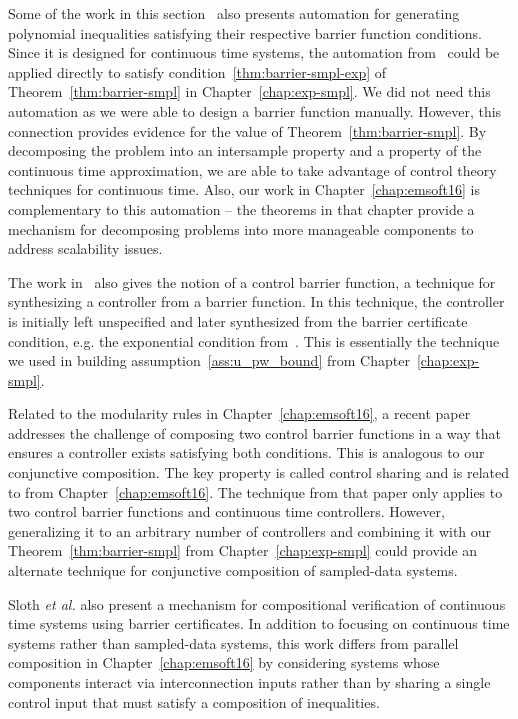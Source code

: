 Some of the work in this
section~\cite{Dai17revisited,kong2013barrier,Zeng16barrier} also presents
automation for generating polynomial inequalities satisfying their
respective barrier function conditions. Since it is designed for continuous
time systems, the automation from~\cite{kong2013barrier} could be applied
directly to satisfy condition~\eqref{thm:barrier-smpl-exp} of
Theorem~\ref{thm:barrier-smpl} in Chapter~\ref{chap:exp-smpl}. We did not
need this automation as we were able to design a barrier function
manually. However, this connection provides evidence for the value of
Theorem~\ref{thm:barrier-smpl}. By decomposing the problem into an
intersample property and a property of the continuous time approximation,
we are able to take advantage of control theory techniques for continuous
time. Also, our work in Chapter~\ref{chap:emsoft16} is complementary to
this automation -- the theorems in that chapter provide a mechanism for
decomposing problems into more manageable components to address scalability
issues.

The work in~\cite{ames2016control,xu15barrier} also gives the notion of a
control barrier function, a technique for synthesizing a controller from a
barrier function. In this technique, the controller is initially left
unspecified and later synthesized from the barrier certificate condition,
e.g. the exponential condition from~\cite{kong2013barrier}. This is
essentially the technique we used in building
assumption~\ref{ass:u_pw_bound} from Chapter~\ref{chap:exp-smpl}.

Related to the modularity rules in Chapter~\ref{chap:emsoft16}, a recent
paper~\cite{xu16sharing} addresses the challenge of composing two control
barrier functions in a way that ensures a controller exists satisfying both
conditions. This is analogous to our conjunctive composition. The key
property is called control sharing and is related to \progress{} from
Chapter~\ref{chap:emsoft16}. The technique from that paper only applies to
two control barrier functions and continuous time controllers. However,
generalizing it to an arbitrary number of controllers and combining it with
our Theorem~\ref{thm:barrier-smpl} from Chapter~\ref{chap:exp-smpl} could
provide an alternate technique for conjunctive composition of sampled-data
systems.

Sloth \emph{et al.}\cite{Sloth12composition} also present a mechanism for
compositional verification of continuous time systems using barrier
certificates. In addition to focusing on continuous time systems rather
than sampled-data systems, this work differs from parallel composition in
Chapter~\ref{chap:emsoft16} by considering systems whose components
interact via interconnection inputs rather than by sharing a single control
input that must satisfy a composition of inequalities.

